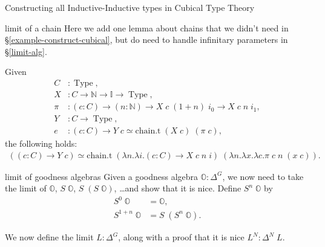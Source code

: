 \documentclass[runningheads]{llncs}
\DeclareMathOperator{\USet}{Type}
\newcommand{\N}{\mathbb{N}}
\newcommand{\II}{\mathbb{I}}
\newcommand{\bbO}{\mathbb{O}}
\begin{document}
{\begin{section}{Constructing all Inductive-Inductive types in Cubical Type Theory}
\begin{subsection}{limit of a chain}
Here we add one lemma about chains that we didn't need in \S\ref{example-construct-cubical}, but do need to handle infinitary parameters in \S\ref{limit-alg}.

\begin{lemma}
    Given \begin{align*}
    C &: \USet,\\
    X &: C \to \N \to \II \to \USet,\\
    \pi &: (c : C) \to (n : \N) \to X\;c\;(1+n)\;i_0 \to X\;c\;n\;i_1,\\
    Y &: C \to \USet,\\
    e &: (c : C) \to Y\;c \simeq \text{chain.t}\;(X\;c)\;(\pi\;c),
    \end{align*}
    the following holds:
    \begin{gather*}
    ((c : C) \to Y\;c) \simeq \text{chain.t}\;(\lambda n.\lambda i.(c : C) \to X\;c\;n\;i)\;(\lambda n.\lambda x.\lambda c. \pi\;c\;n\;(x\;c)).
    \end{gather*}
\end{lemma}

\end{subsection}
\begin{subsection}{limit of goodness algebras}\label{limit-alg}
Given a goodness algebra $\bbO : \Delta^G$, we now need to take the limit of $\bbO$, $S\;\bbO$, $S\;(S\;\bbO)$, \dots and show that it is nice.
Define $S^n\;\bbO$ by \begin{align*}S^0\;\bbO &= \bbO,\\ S^{1+n}\;\bbO &= S\;(S^n\;\bbO).\end{align*}

We now define the limit $L : \Delta^G$, along with a proof that it is nice $L^N : \Delta^N\;L$.


\end{subsection}
\end{section}}
\end{document}
